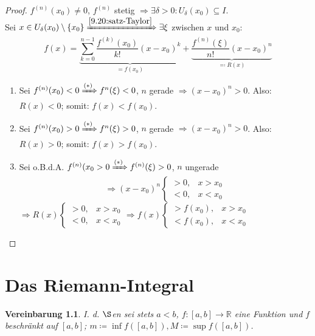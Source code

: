 \documentclass{extreport}
\newcommand{\R}{\mathbb{R}}
\theoremstyle{named}
\theoremstyle{dotless}
\newtheorem*{vereinbarung}{Vereinbarung}
\begin{document}
\begin{proof}
	$f^{(n)}(x_{0}) \neq 0$, $f^{(n)}$ stetig $\Rightarrow \exists \delta > 0: U_{\delta}(x_{0}) \subseteq I$. \\
	Sei $x \in U_{\delta}(x_{0}) \setminus \{ x_{0} \} \xRightarrow[]{\ref{9.20:satz-Taylor}} \exists \xi$ zwischen $x$ und $x_{0}$:
	$$ f(x) = \underbrace{\sum_{k=0}^{n-1} \frac{f^{(k)}(x_{0})}{k!} (x - x_{0})^{k}}_{= f(x_{0})} + \underbrace{\frac{f^{(n)}(\xi)}{n!} (x - x_{0})^{n}}_{\eqqcolon R(x)} $$
	\begin{enumerate}
		\item Sei $f^{(n)}(x_{0}) < 0 \xRightarrow[]{(*)} f^{n}(\xi) < 0$, $n$ gerade $\Rightarrow (x - x_{0})^{n} > 0$. Also: $R(x) < 0$; somit: $f(x) < f(x_{0})$.
		\item Sei $f^{(n)}(x_{0}) > 0 \xRightarrow[]{(*)} f^{n}(\xi) > 0$, $n$ gerade $\Rightarrow (x - x_{0})^{n} > 0$. Also: $R(x) > 0$; somit: $f(x) > f(x_{0})$.
		\item Sei o.B.d.A. $f^{(n)}(x_{0} > 0 \xRightarrow[]{(*)} f^{(n)}(\xi) > 0$, $n$ ungerade
			$$ \Rightarrow (x - x_{0})^{n} \begin{cases} > 0, & x > x_{0} \\ < 0, & x < x_{0} \end{cases} $$
			$\Rightarrow R(x) \begin{cases} > 0, & x > x_{0} \\ < 0, & x < x_{0} \end{cases} \Rightarrow f(x) \begin{cases} > f(x_{0}), & x > x_{0} \\ < f(x_{0}), & x < x_{0} \end{cases}$
	\end{enumerate}
\end{proof}


\newpage


\chapter{Das Riemann-Integral}

\begin{vereinbarung}
I. d. $\S$en sei stets $a < b$, $f \colon [a, b] \rightarrow \R$ eine Funktion und $f$ beschränkt auf $[a, b]$; $m \coloneqq \inf f([a, b]), M \coloneqq \sup f([a, b])$. \\
\end{vereinbarung}
\end{document}
